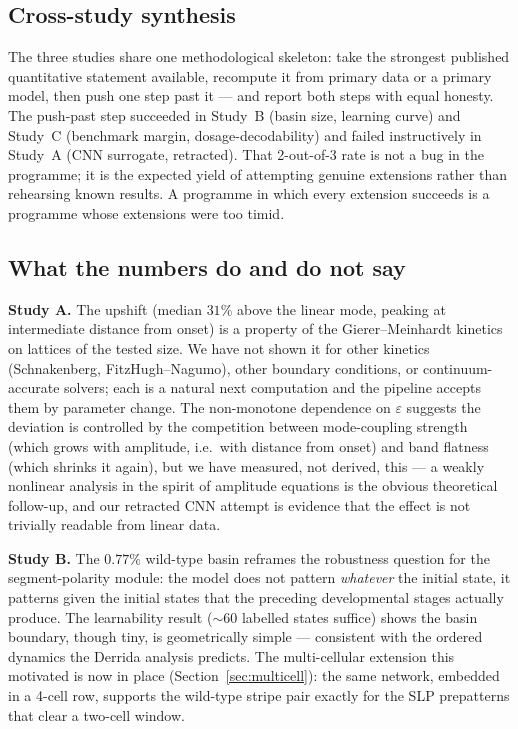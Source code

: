 \label{sec:discussion}

\subsection{Cross-study synthesis}

The three studies share one methodological skeleton: take the strongest
published quantitative statement available, recompute it from primary data or
a primary model, then push one step past it --- and report both steps with
equal honesty. The push-past step succeeded in Study~B (basin size, learning
curve) and Study~C (benchmark margin, dosage-decodability) and failed
instructively in Study~A (CNN surrogate, retracted). That 2-out-of-3 rate is
not a bug in the programme; it is the expected yield of attempting genuine
extensions rather than rehearsing known results. A programme in which every
extension succeeds is a programme whose extensions were too timid.

\subsection{What the numbers do and do not say}

\textbf{Study A.} The upshift (median $31\%$ above the linear mode, peaking
at intermediate distance from onset) is a property of the Gierer--Meinhardt
kinetics on lattices of the tested size. We have not shown it for other
kinetics (Schnakenberg, FitzHugh--Nagumo), other boundary conditions, or
continuum-accurate solvers; each is a natural next computation and the
pipeline accepts them by parameter change. The non-monotone dependence on
$\varepsilon$ suggests the deviation is controlled by the competition between
mode-coupling strength (which grows with amplitude, i.e.\ with distance from
onset) and band flatness (which shrinks it again), but we have measured, not
derived, this --- a weakly nonlinear analysis in the spirit of amplitude
equations is the obvious theoretical follow-up, and our retracted CNN attempt
is evidence that the effect is not trivially readable from linear data.

\textbf{Study B.} The $0.77\%$ wild-type basin reframes the robustness
question for the segment-polarity module: the model does not pattern
\emph{whatever} the initial state, it patterns given the initial states that
the preceding developmental stages actually produce. The learnability result
($\sim 60$ labelled states suffice) shows the basin boundary, though tiny, is
geometrically simple --- consistent with the ordered dynamics the Derrida
analysis predicts. The multi-cellular extension this motivated is now in place
(Section~\ref{sec:multicell}): the same network, embedded in a 4-cell row,
supports the wild-type stripe pair exactly for the SLP prepatterns that
clear a two-cell window.

